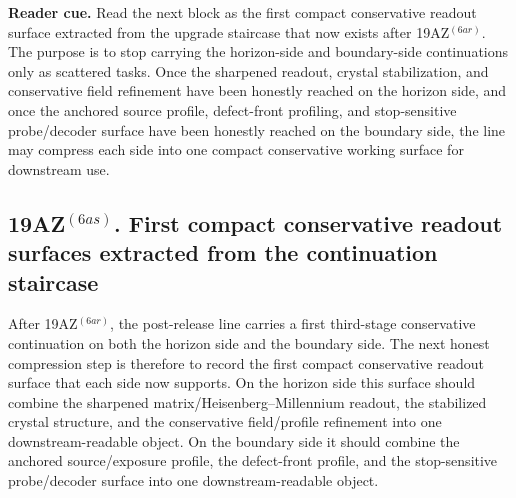 \noindent\textbf{Reader cue.} Read the next block as the first compact conservative readout surface extracted from the upgrade staircase that now exists after 19AZ$^{(6ar)}$. The purpose is to stop carrying the horizon-side and boundary-side continuations only as scattered tasks. Once the sharpened readout, crystal stabilization, and conservative field refinement have been honestly reached on the horizon side, and once the anchored source profile, defect-front profiling, and stop-sensitive probe/decoder surface have been honestly reached on the boundary side, the line may compress each side into one compact conservative working surface for downstream use.

\subsection*{19AZ$^{(6as)}$. First compact conservative readout surfaces extracted from the continuation staircase}
\label{sec:first-compact-conservative-readout-surfaces-extracted-from-the-continuation-staircase}
After 19AZ$^{(6ar)}$, the post-release line carries a first third-stage conservative continuation on both the horizon side and the boundary side. The next honest compression step is therefore to record the first compact conservative readout surface that each side now supports. On the horizon side this surface should combine the sharpened matrix/Heisenberg--Millennium readout, the stabilized crystal structure, and the conservative field/profile refinement into one downstream-readable object. On the boundary side it should combine the anchored source/exposure profile, the defect-front profile, and the stop-sensitive probe/decoder surface into one downstream-readable object.

